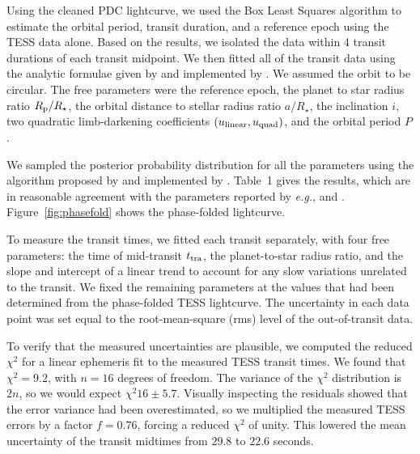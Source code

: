 \documentclass[12pt,twocolumn,tighten]{aastex62}
\begin{document}
Using the cleaned PDC lightcurve, we used the Box Least Squares
algorithm \citep{kovacs_box-fitting_2002} to estimate the orbital
period, transit duration, and a reference epoch using the TESS data
alone.  Based on the results, we isolated the data within 4 transit
durations of each transit midpoint.  We then fitted all of the transit
data using the analytic formulae given by \citet{mandel_analytic_2002}
and implemented by \citet{kreidberg_batman_2015}.  We assumed the
orbit to be circular. The free parameters were the reference epoch,
the planet to star radius ratio $R_{\rm p}/R_\star$, the orbital
distance to stellar radius ratio $a/R_\star$, the inclination $i$, two
quadratic limb-darkening coefficients $(u_{\rm linear}, u_{\rm
  quad})$, and the orbital period $P$.

We sampled the posterior probability distribution for all the
parameters using the algorithm proposed by
\citet{goodman_ensemble_2010} and implemented by
\citet{foreman-mackey_emcee_2013}.  Table~1 gives the results, which
are in reasonable agreement with the parameters reported by {\it
  e.g.}, \citet{southworth_high-precision_2009} and
\citet{huitson_gemini_2017}.  Figure~\ref{fig:phasefold} shows the
phase-folded lightcurve.

To measure the transit times, we fitted each transit separately, with
four free parameters: the time of mid-transit $t_{\rm tra}$, the
planet-to-star radius ratio, and the slope and intercept of a linear
trend to account for any slow variations unrelated to the transit.  We
fixed the remaining parameters at the values that had been determined
from the phase-folded TESS lightcurve.  The uncertainty in each
data point was set equal to the root-mean-square (rms) level of the
out-of-transit data.

To verify that the measured uncertainties are plausible, we computed
the reduced $\chi^2$ for a linear ephemeris fit to the measured TESS
transit times.  We found that $\chi^2 = 9.2$, with $n=16$ degrees of
freedom.  The variance of the $\chi^2$ distribution is $2n$, so we
would expect $\chi^2 16 \pm 5.7$.  Visually inspecting the residuals
showed that the error variance had been overestimated, so we
multiplied the measured TESS errors by a factor $f=0.76$, forcing a
reduced $\chi^2$ of unity.  This lowered the mean uncertainty of the
transit midtimes from $29.8$ to $22.6$ seconds.
\end{document}
